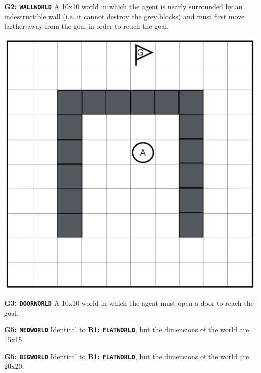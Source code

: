 \documentclass[]{article}
\begin{document}

{\bf G2: \texttt{WALLWORLD}} A 10x10 world in which the agent is nearly surrounded by an indestructible wall (i.e. it cannot destroy the grey blocks) and must first move farther away from the goal in order to reach the goal.

\begin{center}
\includegraphics[scale=0.21]{figures/uwall.png}
\end{center}

{\bf G3: \texttt{DOORWORLD}} A 10x10 world in which the agent must open a door to reach the goal.



%




{\bf G5: \texttt{MEDWORLD}} Identical to {\bf B1: \texttt{FLATWORLD}}, but the dimensions of the world are 15x15.


{\bf G5: \texttt{BIGWORLD}} Identical to {\bf B1: \texttt{FLATWORLD}}, but the dimensions of the world are 20x20.
\end{document}
